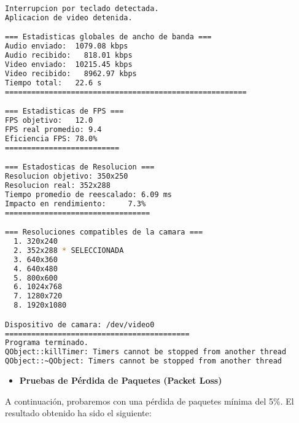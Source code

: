 \begin{adjustbox}{max width=\textwidth}
\begin{lstlisting}[language=bash,basicstyle=\ttfamily\scriptsize]
Interrupcion por teclado detectada.
Aplicacion de video detenida.

=== Estadisticas globales de ancho de banda ===
Audio enviado:	1079.08 kbps
Audio recibido:   818.01 kbps
Video enviado:	10215.45 kbps
Video recibido:   8962.97 kbps
Tiempo total: 	22.6 s
=======================================================

=== Estadisticas de FPS ===
FPS objetivo: 	12.0
FPS real promedio: 9.4
Eficiencia FPS:	78.0%
==========================

=== Estadosticas de Resolucion ===
Resolucion objetivo: 350x250
Resolucion real: 352x288
Tiempo promedio de reescalado: 6.09 ms
Impacto en rendimiento:    	7.3%
=================================

=== Resoluciones compatibles de la camara ===
  1. 320x240
  2. 352x288 * SELECCIONADA
  3. 640x360
  4. 640x480
  5. 800x600
  6. 1024x768
  7. 1280x720
  8. 1920x1080

Dispositivo de camara: /dev/video0
==========================================
Programa terminado.
QObject::killTimer: Timers cannot be stopped from another thread
QObject::~QObject: Timers cannot be stopped from another thread
\end{lstlisting}
\end{adjustbox}
\vspace{\baselineskip}

\newpage

\begin{itemize}
    \item \textbf{Pruebas de Pérdida de Paquetes (Packet Loss)}
\end{itemize}

A continuación, probaremos con una pérdida de paquetes mínima del 5\%. El resultado obtenido ha sido el siguiente:
\vspace{\baselineskip}

